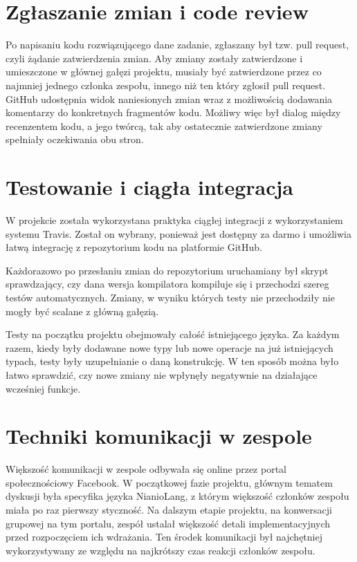 \documentclass[licencjacka]{pracamgr}
\begin{document}
\section{Zgłaszanie zmian i code review}
Po napisaniu kodu rozwiązującego dane zadanie, zgłaszany był tzw. pull request,
czyli żądanie zatwierdzenia zmian. Aby zmiany zostały zatwierdzone i umieszczone
w głównej gałęzi projektu, musiały być zatwierdzone przez co najmniej jednego członka
zespołu, innego niż ten który zgłosił pull request. GitHub udostępnia widok naniesionych zmian
wraz z możliwością dodawania komentarzy do konkretnych fragmentów kodu. Możliwy więc
był dialog między recenzentem kodu, a jego twórcą, tak aby ostatecznie zatwierdzone
zmiany spełniały oczekiwania obu stron.

\section{Testowanie i ciągła integracja}
W projekcie została wykorzystana praktyka ciągłej integracji z wykorzystaniem systemu Travis.
Został on wybrany, ponieważ jest dostępny za darmo i umożliwia łatwą integrację z repozytorium kodu
na platformie GitHub.

Każdorazowo po przesłaniu zmian do repozytorium uruchamiany był skrypt sprawdzający, czy dana wersja kompilatora
kompiluje się i przechodzi szereg testów automatycznych.
Zmiany, w wyniku których testy nie przechodziły nie mogły być scalane z główną gałęzią.

Testy na początku projektu obejmowały całość istniejącego języka.
Za każdym razem, kiedy były dodawane nowe typy lub nowe operacje na już istniejących typach,
testy były uzupełnianie o daną konstrukcję.
W ten sposób można było łatwo sprawdzić, czy nowe zmiany nie wpłynęły negatywnie na działające wcześniej funkcje.

\section{Techniki komunikacji w zespole}
Większość komunikacji w zespole odbywała się online przez portal społecznościowy Facebook.
W początkowej fazie projektu, głównym tematem dyskusji była specyfika języka NianioLang,
z którym większość członków zespołu miała po raz pierwszy styczność.
Na dalszym etapie projektu, na konwersacji grupowej na tym portalu, zespół
ustalał większość detali implementacyjnych przed rozpoczęciem ich wdrażania.
Ten środek komunikacji był najchętniej wykorzystywany ze względu na najkrótszy czas
reakcji członków zespołu.
\end{document}
